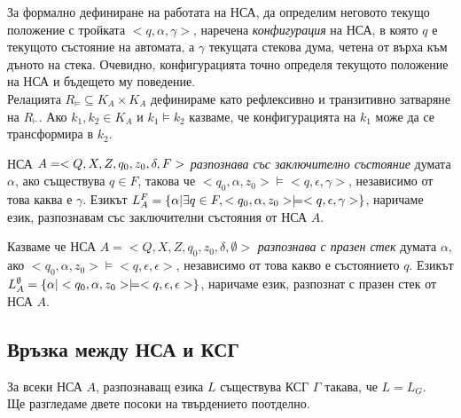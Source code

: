 \documentclass[11pt]{article}
\begin{document}
За формално дефиниране на работата на НСА, да определим неговото текущо положение с тройката $<q, \alpha, \gamma>$, наречена \emph{конфигурация} на НСА, в която $q$ е текущото състояние на автомата, а $\gamma$ текущата стекова дума, четена от върха към дъното на стека. Очевидно, конфигурацията точно определя текущото положение на НСА и бъдещето му поведение. \\

 Релацията $R_{\models} \subseteq K_{A} \times K_{A}$ дефинираме като рефлексивно и транзитивно затваряне на $R_{\vdash}$. Ако $k_{1}, k_{2} \in K_{A}$ и $k_{1} \models k_{2}$ казваме, че конфигурацията на $k_{1}$ може да се трансформира в $k_{2}$. \par

 НСА $A = <Q, X, Z, q_{0}, z_{0}, \delta, F>$ \emph{разпознава със заключително състояние} думата $\alpha$, ако съществува $q \in F$, такова че $< q_{0},\alpha, z_{0}> \models < q, \epsilon, \gamma >$, независимо от това каква е $\gamma$. Езикът $L_{A}^{F} = \{\alpha | \exists q \in F, < q_{0}, \alpha, z_{0} > \models < q, \epsilon, \gamma>\}$, наричаме език, разпознавам със заключителни състояния от НСА $A$. \par

 Казваме че НСА $A = < Q, X, Z, q_{0}, z_{0}, \delta, \emptyset>$ \emph{разпознава с празен стек} думата $\alpha$, ако $< q_{0}, \alpha, z_{0} > \models < q, \epsilon, \epsilon>$, независимо от това какво е състоянието $q$. Езикът $L_{A}^{\emptyset} = \{\alpha | < q_{0}, \alpha, z_{0}> \models < q, \epsilon, \epsilon>\}$, наричаме език, разпознат с празен стек от НСА $A$. 

\subsection{Връзка между НСА и КСГ}
\theorem За всеки НСА $A$, разпознаващ езика $L$ съществува КСГ $\Gamma$ такава, че $L = L_{G}$.\\
\proof Ще разгледаме двете посоки на твърдението поотделно.
\end{document}
